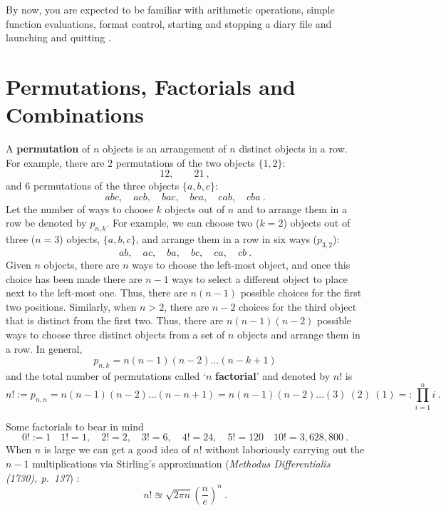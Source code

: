 By now, you are expected to be familiar with arithmetic operations, simple function evaluations, format control, starting and stopping a diary file and launching and quitting \Matlab.
 
\section{Permutations, Factorials and Combinations}\label{S:PermsFactsCombs}
\begin{definition}
A {\bf permutation} of $n$ objects is an arrangement of $n$ distinct objects in a row.  For example, there are $2$ permutations of the two objects $\{1,2\}$:
\[
12, \qquad 21 \ ,
\]
and $6$ permutations of the three objects $\{a,b,c\}$:
\[
abc, \quad acb, \quad bac, \quad bca, \quad cab, \quad cba \ .
\]
Let the number of ways to choose $k$ objects out of $n$ and to arrange them in a row be denoted by $p_{n,k}$.  For example, we can choose two ($k=2$) objects out of three ($n=3$) objects, $\{a,b,c\}$, and arrange them in a row in six ways ($p_{3,2}$):
\[
ab, \quad ac, \quad ba, \quad bc, \quad ca, \quad cb \ .
\]
Given $n$ objects, there are $n$ ways to choose the left-most object, and once this choice has been made there are $n-1$ ways to select a different object to place next to the left-most one.  Thus, there are $n(n-1)$ possible choices for the first two positions.  Similarly, when $n>2$, there are $n-2$ choices for the third object that is distinct from the first two.  Thus, there are $n(n-1)(n-2)$ possible ways to choose three distinct objects from a set of $n$ objects and arrange them in a row.  In general, 
\[
p_{n,k} = n(n-1)(n-2)\ldots (n-k+1)
\]
and the total number of permutations called `$n$ {\bf factorial}' and denoted by $n!$ is
\[
n! := p_{n,n} = n (n-1) (n-2)\ldots (n-n+1) = n (n-1) (n-2)\ldots (3) \ (2) \ (1) =: \prod_{i=1}^n i \ .
\]
\end{definition}

Some factorials to bear in mind
\[
0! := 1 \quad 1!=1, \quad 2!=2, \quad 3!=6, \quad 4!=24, \quad 5!=120 \quad 10!=3,628,800 \ .
\]
When $n$ is large we can get a good idea of $n!$ without laboriously carrying out the $n-1$ multiplications via Stirling's approximation ({\it Methodus Differentialis (1730), p.~137}) :
\[
n! \approxeq \sqrt{2 \pi n} \left( \frac{n}{e} \right)^n \ .
\]

